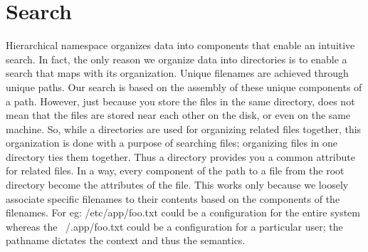 \section{Search}\label{sec:search}

Hierarchical namespace organizes data into components that enable an intuitive search. In fact, the only reason we organize data into directories is to enable a search that maps with its organization. 
Unique filenames are achieved through unique paths. Our search is based on the assembly of these unique components of a path. However, just because you store the files in the same directory, does not mean that the files are stored near each other on the disk, or even on the same machine. So, while a directories are used for organizing related files together, this organization is done with a purpose of searching files; organizing files in one directory ties them together. Thus a directory provides you a common attribute for related files.  
In a way, every component of the path to a file from the root directory become the attributes of the file. This works only because we loosely associate specific filenames to their contents based on the components of the filenames. For eg: /etc/app/foo.txt could be a configuration for the entire system whereas the ~/.app/foo.txt could be a configuration for a particular user; the pathname dictates the context and thus the semantics. 

